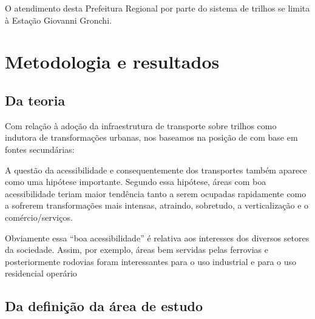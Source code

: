 	O atendimento desta Prefeitura Regional por parte do sistema de trilhos se limita à Estação Giovanni Gronchi.
	
%
%

	\chapter{Metodologia e resultados}
	
	\section{Da teoria}
	
	Com relação à adoção da infraestrutura de transporte sobre trilhos como indutora de transformações urbanas, nos baseamos na posição de  com base em fontes secundárias:
	
	\begin{citacao}
		A questão da acessibilidade e consequentemente dos transportes também
		aparece como uma hipótese importante. Segundo essa hipótese, áreas com
		boa acessibilidade teriam maior tendência tanto a serem ocupadas
		rapidamente como a sofrerem transformações mais intensas, atraindo,
		sobretudo, a verticalização e o comércio/serviços.
		
		Obviamente essa “boa acessibilidade” é relativa aos interesses dos diversos
		setores da sociedade. Assim, por exemplo, áreas bem servidas pelas ferrovias
		e posteriormente rodovias foram interessantes para o uso industrial e para o
		uso residencial operário
	\end{citacao}

	\section{Da definição da área de estudo}
	
